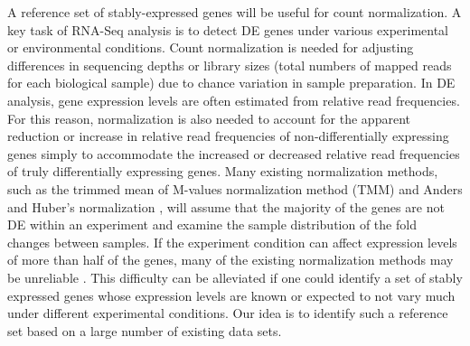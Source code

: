 	A reference set of stably-expressed genes will be useful for count
	normalization.  A key task of RNA-Seq analysis is to detect DE genes under
	various experimental or environmental conditions. Count normalization is
	needed for adjusting differences in sequencing depths or library sizes (total
	numbers of mapped reads for each biological sample) due to chance variation in
	sample preparation.  In DE analysis, gene expression levels are often
	estimated from relative read frequencies. For this reason, normalization is
	also needed to account for the apparent reduction or increase in relative read
	frequencies of non-differentially expressing genes simply to accommodate the
	increased or decreased relative read frequencies of truly differentially
	expressing genes.  Many existing normalization methods, such as the trimmed
	mean of M-values normalization method (TMM) \citep{robinson2010scaling} and
	Anders and Huber's normalization \citep{anders2010differential}, will  assume that the
	majority of the genes are not DE within an experiment and examine the sample
	distribution of the fold changes between samples.
	If the experiment condition can affect expression levels of more than half of
	the genes, many of the existing normalization methods may be unreliable
	\citep{loven2012revisiting, wu2013use}.  This difficulty can be
	alleviated if one could identify a set of stably expressed genes whose
	expression levels are known or expected to not vary much under different
	experimental conditions. Our idea is to identify such a reference set based on
	a large number of existing data sets.
	
